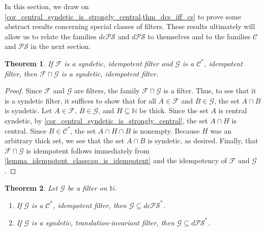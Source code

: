\documentclass[letter,11pt]{article}
\theoremstyle{plain}
\newtheorem{theorem}{Theorem}
\theoremstyle{definition}
\theoremstyle{plain}
\theoremstyle{plain}
\numberwithin{equation}{section}
\newcommand{\N}{\mathbb{N}}
\newcommand{\PS}{\mathcal{PS}}
\newcommand{\dPS}{d\mathcal{PS}}
\newcommand{\dcPS}{dc\mathcal{PS}}
\newcommand{\central}{\mathcal{C}}
\newcommand{\filter}{\mathscr{F}}
\newcommand{\filtertwo}{\mathscr{G}}
\newcommand{\classcap}{\sqcap}
\newcommand{\familytwo}{\mathscr{G}}
\newcommand{\familycap}{\sqcap}
\begin{document}
In this section, we draw on \cref{cor_central_syndetic_is_strongly_central,thm_dcs_iff_cs} to prove some abstract results concerning special classes of filters. These results ultimately will allow us to relate the families $\dcPS$ and $\dPS$ to themselves and to the families $\central$ and $\PS$ in the next section.




\begin{theorem}
\label{prop:general_abstract_intersection_filter_nonsense}
    If $\filter$ is a syndetic, idempotent filter and $\filtertwo$ is a $\central^*$, idempotent filter, then $\filter \familycap \filtertwo$ is a syndetic, idempotent filter.
\end{theorem}
\begin{proof}
    Since $\filter$ and $\filtertwo$ are filters, the family $\filter \familycap \filtertwo$ is a filter.  Thus, to see that it is a syndetic filter, it suffices to show that for all $A \in \filter$ and $B \in \filtertwo$, the set $A \cap B$ is syndetic.  Let $A \in \filter$, $B \in \filtertwo$, and $H \subseteq \N$ be thick.  Since the set $A$ is central syndetic, by \cref{cor_central_syndetic_is_strongly_central}, the set $A \cap H$ is central. Since $B \in \central^*$, the set $A \cap H \cap B$ is nonempty.  Because $H$ was an arbitrary thick set, we see that the set $A \cap B$ is syndetic, as desired. Finally, that $\filter \classcap \filtertwo$ is idempotent follows immediately from \cref{lemma_idempotent_classcap_is_idempotent} and the idempotency of $\filter$ and $\filtertwo$.
\end{proof}
   

\begin{theorem}
\label{cor_central_class_equalities}
\label{cor_shifted_class_equalities}
Let $\familytwo$ be a filter on $\N$.
\begin{enumerate}
    \item
    \label{item_central_star_class_cap}
    If $\filtertwo$ is a $\central^*$, idempotent filter, then $\filtertwo \subseteq \dcPS^*$.

    \item
    \label{item_syndetic_trans_inv_star_class_cap}
    If $\filtertwo$ is a syndetic, translation-invariant filter, then $\filtertwo \subseteq \dPS^*$.
\end{enumerate}
\end{theorem}
\end{document}
